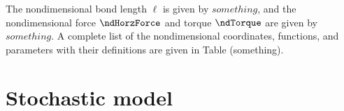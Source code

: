 The nondimensional bond length $\ell$ is given by $something$, and the
nondimensional force $\ndHorzForce$ and torque $\ndTorque$ are given
by $something$. A complete list of the nondimensional coordinates,
functions, and parameters with their definitions are given in Table
(something).

\section{Stochastic model}
\label{sec:stochastic-model}

